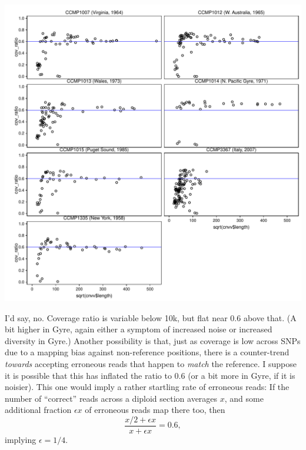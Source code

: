\documentclass{article}\usepackage[]{graphicx}\usepackage[]{color}
\makeatletter
\def\maxwidth{ %
  \ifdim\Gin@nat@width>\linewidth
    \linewidth
  \else
    \Gin@nat@width
  \fi
}
\newenvironment{knitrout}{}{} %
\makeatother
\begin{document}
\begin{knitrout}
{\centering \includegraphics[width=\maxwidth]{figs-knitr/unnamed-chunk-32-1} 

}



\end{knitrout}

I'd say, no.  Coverage ratio is variable below 10k, but flat near 0.6 above that.  (A bit higher in Gyre, again either a symptom of increased noise or increased diversity in Gyre.)  Another possibility is that, just as coverage is low across SNPs due to a mapping bias against non-reference positions, there is a counter-trend \emph{towards} accepting erroneous reads that happen to \emph{match} the reference.  I suppose it is possible that this has inflated the ratio to 0.6 (or a bit more in Gyre, if it is noisier).  This one would imply a rather startling rate of erroneous reads:  If the number of ``correct'' reads across a diploid section averages $x$, and some additional fraction $\epsilon x$ of erroneous reads map there too, then 
  $$ \frac{x/2+\epsilon x}{x+\epsilon x}=0.6,$$ 
implying $\epsilon=1/4$. 
\end{document}
